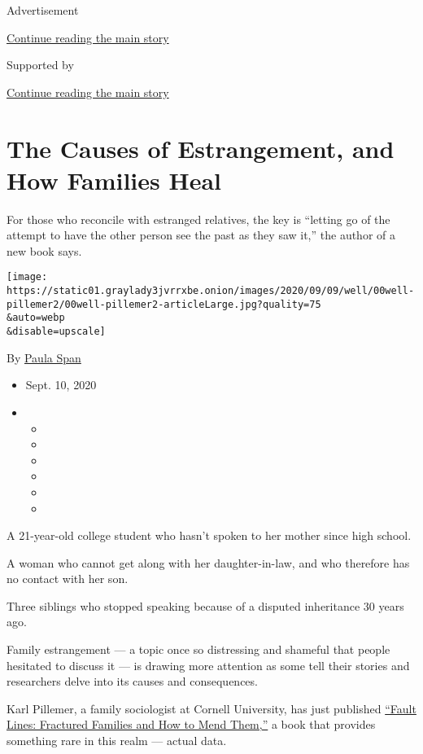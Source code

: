 Advertisement

\protect\hyperlink{after-top}{Continue reading the main story}

Supported by

\protect\hyperlink{after-sponsor}{Continue reading the main story}

\hypertarget{the-causes-of-estrangement-and-how-families-heal}{%
\section{The Causes of Estrangement, and How Families
Heal}\label{the-causes-of-estrangement-and-how-families-heal}}

For those who reconcile with estranged relatives, the key is ``letting
go of the attempt to have the other person see the past as they saw
it,'' the author of a new book says.

\texttt{[image: https://static01.graylady3jvrrxbe.onion/images/2020/09/09/well/00well-pillemer2/00well-pillemer2-articleLarge.jpg?quality=75\\\&auto=webp\\\&disable=upscale]}

By \href{https://www.nytimes3xbfgragh.onion/by/paula-span}{Paula Span}

\begin{itemize}
\item
  Sept. 10, 2020
\item
  \begin{itemize}
  \item
  \item
  \item
  \item
  \item
  \item
  \end{itemize}
\end{itemize}

A 21-year-old college student who hasn't spoken to her mother since high
school.

A woman who cannot get along with her daughter-in-law, and who therefore
has no contact with her son.

Three siblings who stopped speaking because of a disputed inheritance 30
years ago.

Family estrangement --- a topic once so distressing and shameful that
people hesitated to discuss it --- is drawing more attention as some
tell their stories and researchers delve into its causes and
consequences.

Karl Pillemer, a family sociologist at Cornell University, has just
published
\href{https://www.penguinrandomhouse.com/books/595000/fault-lines-by-karl-pillemer-phd/}{``Fault
Lines: Fractured Families and How to Mend Them,''} a book that provides
something rare in this realm --- actual data.

